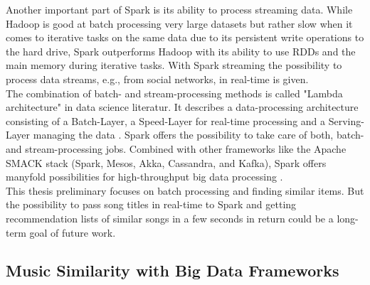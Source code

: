 \noindent Another important part of Spark is its ability to process streaming data. While Hadoop is good at batch processing very large datasets but rather slow when it comes to iterative tasks on the same data due to its persistent write operations to the hard drive, Spark outperforms Hadoop with its ability to use RDDs and the main memory during iterative tasks. 
With Spark streaming the possibility to process data streams, e.g., from social networks, in real-time is given.\\
The combination of batch- and stream-processing methods is called "Lambda architecture" in data science literatur. It describes a data-processing architecture consisting of a Batch-Layer, a Speed-Layer for real-time processing and a Serving-Layer managing the data \cite[pp. 8 f]{nextgenbig}. Spark offers the possibility to take care of both, batch- and stream-processing jobs. Combined with other frameworks like the Apache SMACK stack (Spark, Mesos, Akka, Cassandra, and Kafka), Spark offers manyfold possibilities for high-throughput big data processing \cite[p. 5]{smack}.\\
This thesis preliminary focuses on batch processing and finding similar items. But the possibility to pass song titles in real-time to Spark and getting recommendation lists of similar songs in a few seconds in return could be a long-term goal of future work.\\

\subsection{Music Similarity with Big Data Frameworks}

